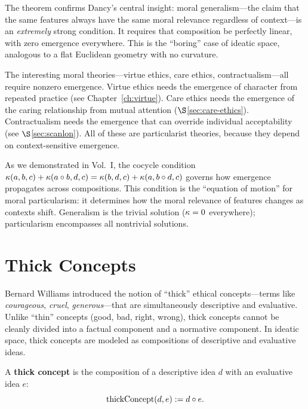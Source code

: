 \begin{interpretation}
The theorem confirms Dancy's central insight: moral generalism---the claim
that the same features always have the same moral relevance regardless of
context---is an \emph{extremely} strong condition. It requires that
composition be perfectly linear, with zero emergence everywhere. This is
the ``boring'' case of ideatic space, analogous to a flat Euclidean geometry
with no curvature.

The interesting moral theories---virtue ethics, care ethics,
contractualism---all require nonzero emergence. Virtue ethics needs the
emergence of character from repeated practice (see Chapter~\ref{ch:virtue}).
Care ethics needs the emergence of the caring relationship from mutual
attention ($\S$\ref{sec:care-ethics}). Contractualism needs the emergence
that can override individual acceptability (see $\S$\ref{sec:scanlon}).
All of these are particularist theories, because they depend on context-sensitive
emergence.

As we demonstrated in Vol.~I, the cocycle condition
$\kappa(a,b,c) + \kappa(a \circ b, d, c) = \kappa(b, d, c)
+ \kappa(a, b \circ d, c)$ governs how emergence propagates across
compositions. This condition is the ``equation of motion'' for moral
particularism: it determines how the moral relevance of features changes
as contexts shift. Generalism is the trivial solution ($\kappa = 0$
everywhere); particularism encompasses all nontrivial solutions.
\end{interpretation}

\section{Thick Concepts}
\label{sec:thick-concepts}

Bernard Williams introduced the notion of ``thick'' ethical concepts---terms
like \emph{courageous}, \emph{cruel}, \emph{generous}---that are simultaneously
descriptive and evaluative. Unlike ``thin'' concepts (good, bad, right, wrong),
thick concepts cannot be cleanly divided into a factual component and a
normative component. In ideatic space, thick concepts are modeled as
compositions of descriptive and evaluative ideas.

\begin{definition}
\label{def:thick-concept}
A \textbf{thick concept} is the composition of a descriptive idea $d$ with an
evaluative idea $e$:
\[
  \mathrm{thickConcept}(d, e) := d \circ e.
\]
\end{definition}

